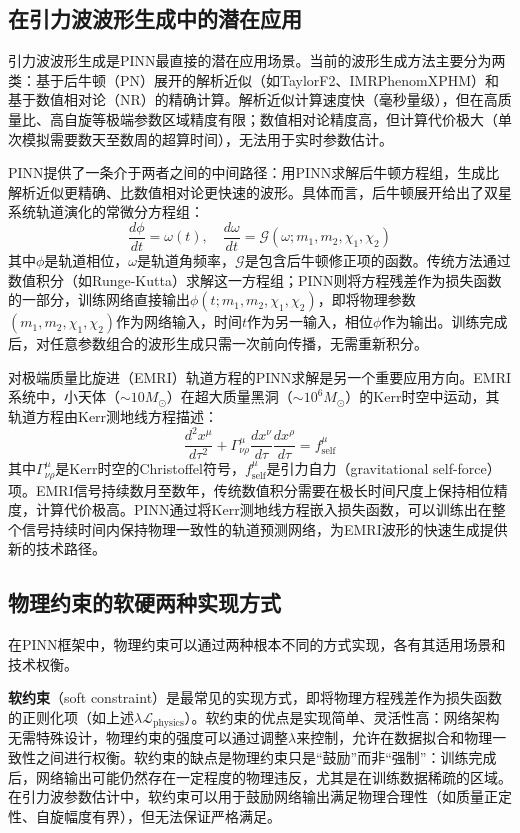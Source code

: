 \subsection*{在引力波波形生成中的潜在应用}

引力波波形生成是PINN最直接的潜在应用场景。当前的波形生成方法主要分为两类：基于后牛顿（PN）展开的解析近似（如TaylorF2、IMRPhenomXPHM）和基于数值相对论（NR）的精确计算。解析近似计算速度快（毫秒量级），但在高质量比、高自旋等极端参数区域精度有限；数值相对论精度高，但计算代价极大（单次模拟需要数天至数周的超算时间），无法用于实时参数估计。

PINN提供了一条介于两者之间的中间路径：用PINN求解后牛顿方程组，生成比解析近似更精确、比数值相对论更快速的波形。具体而言，后牛顿展开给出了双星系统轨道演化的常微分方程组：
\begin{equation}
\frac{d\phi}{dt} = \omega(t), \quad \frac{d\omega}{dt} = \mathcal{G}(\omega; m_1, m_2, \chi_1, \chi_2)
\end{equation}
其中$\phi$是轨道相位，$\omega$是轨道角频率，$\mathcal{G}$是包含后牛顿修正项的函数。传统方法通过数值积分（如Runge-Kutta）求解这一方程组；PINN则将方程残差作为损失函数的一部分，训练网络直接输出$\phi(t; m_1, m_2, \chi_1, \chi_2)$，即将物理参数$(m_1, m_2, \chi_1, \chi_2)$作为网络输入，时间$t$作为另一输入，相位$\phi$作为输出。训练完成后，对任意参数组合的波形生成只需一次前向传播，无需重新积分。

对极端质量比旋进（EMRI）轨道方程的PINN求解是另一个重要应用方向。EMRI系统中，小天体（$\sim 10 M_\odot$）在超大质量黑洞（$\sim 10^6 M_\odot$）的Kerr时空中运动，其轨道方程由Kerr测地线方程描述：
\begin{equation}
\frac{d^2 x^\mu}{d\tau^2} + \Gamma^\mu_{\nu\rho} \frac{dx^\nu}{d\tau} \frac{dx^\rho}{d\tau} = f^\mu_{\text{self}}
\end{equation}
其中$\Gamma^\mu_{\nu\rho}$是Kerr时空的Christoffel符号，$f^\mu_{\text{self}}$是引力自力（gravitational self-force）项。EMRI信号持续数月至数年，传统数值积分需要在极长时间尺度上保持相位精度，计算代价极高。PINN通过将Kerr测地线方程嵌入损失函数，可以训练出在整个信号持续时间内保持物理一致性的轨道预测网络，为EMRI波形的快速生成提供新的技术路径。

\subsection*{物理约束的软硬两种实现方式}

在PINN框架中，物理约束可以通过两种根本不同的方式实现，各有其适用场景和技术权衡。

\textbf{软约束}（soft constraint）是最常见的实现方式，即将物理方程残差作为损失函数的正则化项（如上述$\lambda \mathcal{L}_{\text{physics}}$）。软约束的优点是实现简单、灵活性高：网络架构无需特殊设计，物理约束的强度可以通过调整$\lambda$来控制，允许在数据拟合和物理一致性之间进行权衡。软约束的缺点是物理约束只是“鼓励”而非“强制”：训练完成后，网络输出可能仍然存在一定程度的物理违反，尤其是在训练数据稀疏的区域。在引力波参数估计中，软约束可以用于鼓励网络输出满足物理合理性（如质量正定性、自旋幅度有界），但无法保证严格满足。

